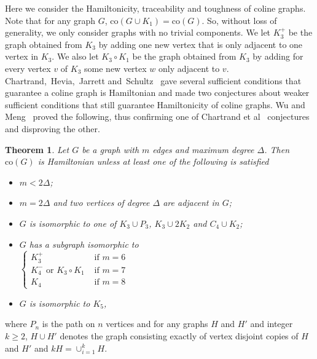 \documentclass[12pt]{article}
\newtheorem{thm}{Theorem}[section]
\theoremstyle{definition}
\newcommand{\com}[1]{{\color{blue} #1}}
\newcommand{\co}{\text{co}}
\begin{document}
Here we consider the Hamiltonicity, traceability and toughness of coline graphs. Note that for any graph $G$, $\co(G\cup K_1) = \co(G)$. So, without loss of generality, we only consider graphs with no trivial components.
We let $K_3^+$ be the graph obtained from $K_3$ by adding one new vertex that is only adjacent to one vertex in $K_3$. We also let $K_3 \circ K_1$ be the graph
obtained from $K_3$ by adding for every vertex $v$ of $K_3$ some new vertex $w$ only 
adjacent to $v$.
Chartrand,~Hevia,~Jarrett and~Schultz~\cite{ChHeJaSc97} gave several sufficient conditions that guarantee a coline graph is Hamiltonian and made two conjectures about weaker sufficient conditions that still guarantee Hamiltonicity of coline graphs.
Wu and Meng~\cite{WuMe04} proved the following, thus confirming one of Chartrand et al~\cite{ChHeJaSc97} conjectures and disproving the other.
\begin{thm}\label{t:WuMe}
Let $G$ be a graph with $m$ edges and maximum degree $\Delta$. Then $\co(G)$ is Hamiltonian unless at least one of the following is satisfied
\begin{itemize}
\item[(i)] $m < 2\Delta$;
\item[(ii)] $m=2\Delta$ and two vertices of degree $\Delta$ are adjacent in $G$;
\item[(iii)] $G$ is isomorphic to one of $K_3\cup P_3$, $K_3 \cup 2K_2$ and $C_4\cup K_2$;
\item[(iv)] $G$ has a subgraph isomorphic to\\
$
\begin{cases}
K_3^+ &\text{ if }m=6 \\
K_4^- \text{ or } K_3\circ K_1 &\text{ if }m=7 \\
K_4 &\text{ if }m=8 
\end{cases}
$
\item[(v)] $G$ is isomorphic to $K_5$,
\end{itemize}
\end{thm}
\noindent
where $P_n$ is the path on $n$ vertices and for any graphs $H$ and $H'$ and integer $k\geq 2$, $H \cup H'$ denotes the graph consisting exactly of vertex disjoint copies of $H$ and $H'$ and $kH = \cup_{i=1}^k H $.
\end{document}
